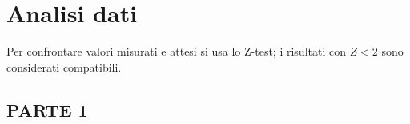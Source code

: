 \section{Analisi dati}

Per confrontare valori misurati e attesi si usa lo Z-test; i risultati con $Z < 2$ sono considerati compatibili.

\subsection{PARTE 1}

